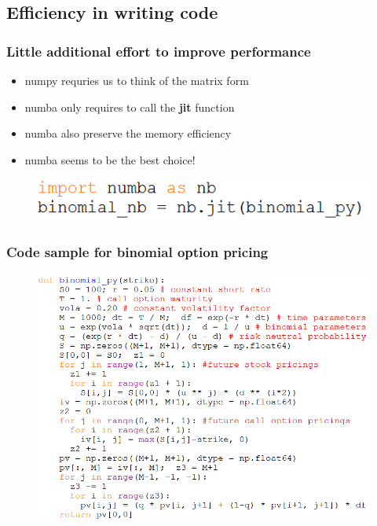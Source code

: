 \documentclass{beamer}
\begin{document}
\subsection{Efficiency in writing code}

\begin{frame}
\frametitle{Little additional effort to improve performance}
\begin{itemize}
	\item numpy requries us to think of the matrix form
	\item numba only requires to call the \textbf{jit} function
	\item numba also preserve the memory efficiency
	\item numba seems to be the best choice!
\end{itemize}
\begin{figure}[H]
	\includegraphics[scale=0.8]{numba_jit.png}
\end{figure}
\end{frame}

\begin{frame}
\frametitle{Code sample for binomial option pricing}
\begin{figure}[H]
	\includegraphics[scale=0.48]{binomial_option_pricing.png}
\end{figure}
\end{frame}
\end{document}
